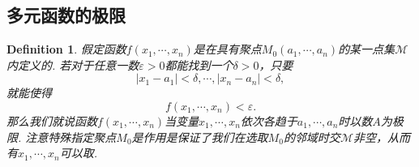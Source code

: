 \documentclass{article}
\newtheorem{definition}[theorem]{Definition}
\begin{document}
\newpage
\subsection{多元函数的极限} 
\begin{definition}
\rm 假定函数$f(x_1,\cdots,x_n)$是在具有聚点$M_0(a_1,\cdots,a_n)$的某一点集$\mathcal{M}$内定义的. 若对于任意一数$\varepsilon > 0$都能找到一个$\delta > 0$，只要
$$
|x_1 - a_1| < \delta, \cdots , |x_n - a_n| < \delta,
$$
就能使得
$$
f(x_1,\cdots,x_n) < \varepsilon.
$$
那么我们就说函数$f(x_1,\cdots,x_n)$当变量$x_1, \cdots, x_n$依次各趋于$a_1, \cdots,a_n$时以数$A$为极限. {\color{blue} 注意特殊指定聚点$M_0$是作用是保证了我们在选取$M_0$的邻域时交$\mathcal{M}$非空，从而有$x_1,\cdots,x_n$可以取}.
\end{definition}
\end{document}
